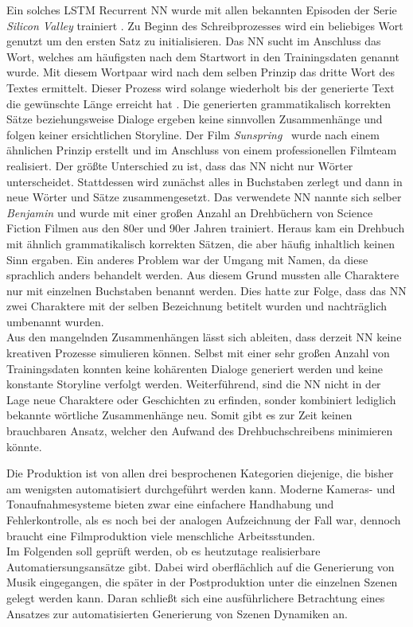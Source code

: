 \documentclass[times, 11pt,twocolumn]{article}
\begin{document}
 \label{sec:SOTAVorverarbeitung}
Ein solches LSTM Recurrent NN wurde mit allen bekannten Episoden der Serie \textit{Silicon Valley} trainiert \cite{DrehbuchSV}. Zu Beginn des Schreibprozesses wird ein beliebiges Wort genutzt um den ersten Satz zu initialisieren. Das NN sucht im Anschluss das Wort, welches am häufigsten nach dem Startwort in den Trainingsdaten genannt wurde. Mit diesem Wortpaar wird nach dem selben Prinzip das dritte Wort des Textes ermittelt. Dieser Prozess wird solange wiederholt bis der generierte Text die gewünschte Länge erreicht hat \cite{DrehbuchWrite}. Die generierten  grammatikalisch korrekten Sätze beziehungsweise Dialoge ergeben keine sinnvollen Zusammenhänge und folgen keiner ersichtlichen Storyline. Der Film \textit{Sunspring}~\cite{DrehbuchMovie} wurde nach einem ähnlichen Prinzip erstellt und im Anschluss von einem professionellen Filmteam realisiert. Der größte Unterschied zu \cite{DrehbuchSV} ist, dass das NN nicht nur Wörter unterscheidet. Stattdessen wird zunächst alles in Buchstaben zerlegt und dann in neue Wörter und Sätze zusammengesetzt. Das verwendete NN nannte sich selber \textit{Benjamin} und wurde mit einer großen Anzahl an Drehbüchern von Science Fiction Filmen aus den 80er und 90er Jahren trainiert. Heraus kam ein Drehbuch mit ähnlich  grammatikalisch korrekten Sätzen, die aber häufig inhaltlich keinen Sinn ergaben. Ein anderes Problem war der Umgang mit Namen, da diese sprachlich anders behandelt werden. Aus diesem Grund mussten alle Charaktere nur mit einzelnen Buchstaben benannt werden. Dies hatte zur Folge, dass das NN zwei Charaktere mit der selben Bezeichnung betitelt wurden und nachträglich umbenannt wurden.\\

Aus den mangelnden Zusammenhängen lässt sich ableiten, dass derzeit NN keine kreativen Prozesse simulieren können. Selbst mit einer sehr großen Anzahl von Trainingsdaten konnten keine kohärenten Dialoge generiert werden und keine konstante Storyline verfolgt werden. Weiterführend, sind die NN nicht in der Lage neue Charaktere oder Geschichten zu erfinden, sonder kombiniert lediglich bekannte wörtliche Zusammenhänge neu. Somit gibt es zur Zeit keinen brauchbaren Ansatz, welcher den Aufwand des Drehbuchschreibens minimieren könnte. 

 \label{sec:Produktion}
Die Produktion ist von allen drei besprochenen Kategorien diejenige, die bisher am wenigsten automatisiert durchgeführt werden kann. Moderne Kameras- und Tonaufnahmesysteme bieten zwar eine einfachere Handhabung und Fehlerkontrolle, als es noch bei der analogen Aufzeichnung der Fall war, dennoch braucht eine Filmproduktion viele menschliche Arbeitsstunden. \\
Im Folgenden soll geprüft werden, ob es heutzutage realisierbare Automatiersungsansätze gibt. Dabei wird oberflächlich auf die Generierung von Musik eingegangen, die später in der Postproduktion unter die einzelnen Szenen gelegt werden kann. Daran schließt sich eine ausführlichere Betrachtung eines Ansatzes zur automatisierten Generierung von Szenen Dynamiken an. 
\end{document}
